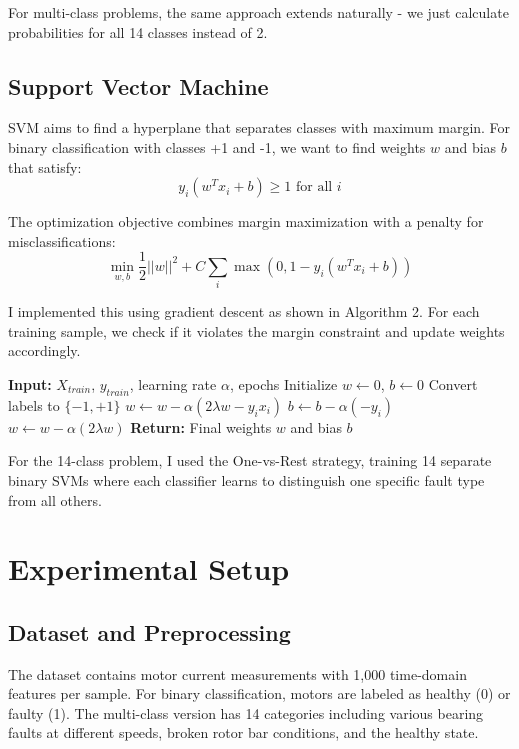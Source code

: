 \documentclass[conference]{IEEEtran}
\begin{document}
For multi-class problems, the same approach extends naturally - we just calculate probabilities for all 14 classes instead of 2.

\subsection{Support Vector Machine}
SVM aims to find a hyperplane that separates classes with maximum margin. For binary classification with classes +1 and -1, we want to find weights $w$ and bias $b$ that satisfy:
\begin{equation}
y_i(w^T x_i + b) \geq 1 \text{ for all } i
\end{equation}

The optimization objective combines margin maximization with a penalty for misclassifications:
\begin{equation}
\min_{w,b} \frac{1}{2}||w||^2 + C\sum_i \max(0, 1-y_i(w^T x_i + b))
\end{equation}

I implemented this using gradient descent as shown in Algorithm 2. For each training sample, we check if it violates the margin constraint and update weights accordingly.

\begin{algorithm}
\caption{SVM Training (Gradient Descent)}
\begin{algorithmic}[1]
\STATE \textbf{Input:} $X_{train}$, $y_{train}$, learning rate $\alpha$, epochs
\STATE Initialize $w \gets 0$, $b \gets 0$
\STATE Convert labels to $\{-1, +1\}$
\STATE $w \gets w - \alpha(2\lambda w - y_i x_i)$
\STATE $b \gets b - \alpha(-y_i)$
\ELSE
\STATE $w \gets w - \alpha(2\lambda w)$
\ENDIF
\ENDFOR
\ENDFOR
\STATE \textbf{Return:} Final weights $w$ and bias $b$
\end{algorithmic}
\end{algorithm}

For the 14-class problem, I used the One-vs-Rest strategy, training 14 separate binary SVMs where each classifier learns to distinguish one specific fault type from all others.

\section{Experimental Setup}

\subsection{Dataset and Preprocessing}
The dataset contains motor current measurements with 1,000 time-domain features per sample. For binary classification, motors are labeled as healthy (0) or faulty (1). The multi-class version has 14 categories including various bearing faults at different speeds, broken rotor bar conditions, and the healthy state.
\end{document}
